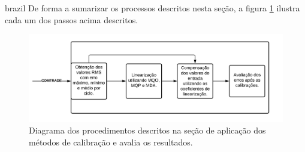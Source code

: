 \begin{otherlanguage*}{brazil}
De forma a sumarizar os processos descritos nesta seção, a figura \ref{fig:diag_met_aval} ilustra cada um dos passos acima descritos.

\begin{figure}[H]
    \centering
    \includegraphics[width=14cm]{pictures/diag_met_avalia.png}
    \caption{Diagrama dos procedimentos descritos na seção de aplicação dos métodos de calibração e avalia os resultados.}
    \label{fig:diag_met_aval}
\end{figure}

\end{otherlanguage*}

